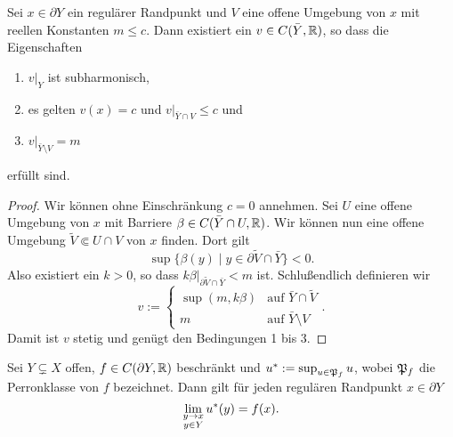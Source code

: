 \begin{lemma}
  \label{lemma:regulär-trennen}
  Sei $x \in \partial Y$ ein regulärer Randpunkt und $V$ eine offene
  Umgebung von $x$ mit reellen Konstanten $m \leq c$. Dann existiert
  ein $v \in C( \bar Y, \mathbb{R})$, so dass die Eigenschaften
  \begin{enumerate}
  \item $v|_Y$ ist subharmonisch,
  \item es gelten $v(x) = c$ und $v|_{\bar Y \cap V} \leq c$ und
  \item $v|_{\bar Y\setminus V} = m$
  \end{enumerate}
  erfüllt sind.
\end{lemma}

\begin{proof}
  Wir können ohne Einschränkung $c = 0$ annehmen. Sei $U$ eine offene Umgebung von $x$ mit Barriere $\beta \in C(\bar
  Y \cap U, \mathbb{R})$. Wir können nun eine offene Umgebung $\tilde V \Subset U \cap V$
  von $x$ finden. Dort gilt
  \[
  \sup\{\beta(y) \mid y \in \partial \tilde V \cap \bar Y \} < 0.
  \]
  Also existiert ein $k > 0$, so dass $k\beta|_{\partial \tilde V \cap
    \bar Y} < m$ ist.
  Schlußendlich definieren wir
  \[
  v :=
  \begin{cases}
    \sup(m, k\beta) & \text{auf } \bar Y \cap \tilde V\\
    m & \text{auf } \bar Y \setminus V
  \end{cases}.
  \]
  Damit ist $v$ stetig und genügt den Bedingungen 1 bis 3.
\end{proof}

\begin{lemma}
  Sei $Y \subsetneq X$ offen, $f \in C(\partial Y, \mathbb{R})$ beschränkt und
  $u^\ast := \sup_{u \in \mathfrak{P}_f}u$, wobei $\mathfrak{P}_f$ die Perronklasse von
  $f$ bezeichnet. Dann gilt für jeden regulären Randpunkt $x \in \partial Y$
  \[
  \lim_{\substack{y \rightarrow x\\y \in Y}} u^\ast(y) = f(x).
  \]
\end{lemma}

